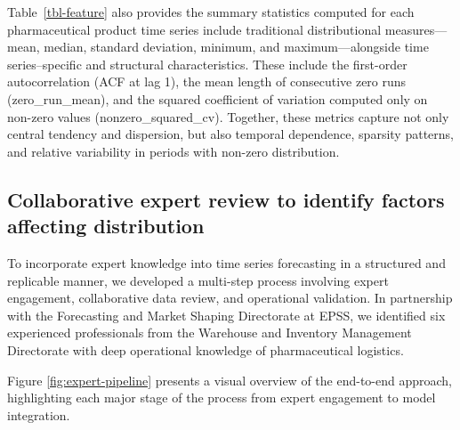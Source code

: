 \documentclass[
  authoryear,
  preprint,
  3p]{elsarticle}
\begin{document}
Table~\ref{tbl-feature} also provides the summary statistics computed
for each pharmaceutical product time series include traditional
distributional measures---mean, median, standard deviation, minimum, and
maximum---alongside time series--specific and structural
characteristics. These include the first-order autocorrelation (ACF at
lag 1), the mean length of consecutive zero runs (zero\_run\_mean), and
the squared coefficient of variation computed only on non-zero values
(nonzero\_squared\_cv). Together, these metrics capture not only central
tendency and dispersion, but also temporal dependence, sparsity
patterns, and relative variability in periods with non-zero
distribution.

\subsection{Collaborative expert review to identify factors affecting
distribution}\label{collaborative-expert-review-to-identify-factors-affecting-distribution}

To incorporate expert knowledge into time series forecasting in a
structured and replicable manner, we developed a multi-step process
involving expert engagement, collaborative data review, and operational
validation. In partnership with the Forecasting and Market Shaping
Directorate at EPSS, we identified six experienced professionals from
the Warehouse and Inventory Management Directorate with deep operational
knowledge of pharmaceutical logistics.

Figure \ref{fig:expert-pipeline} presents a visual overview of the
end-to-end approach, highlighting each major stage of the process from
expert engagement to model integration.
\end{document}
